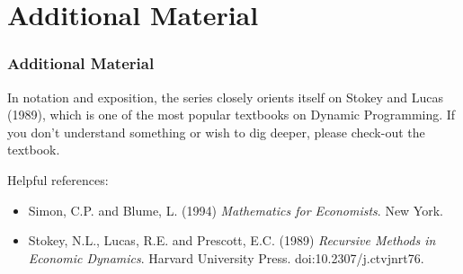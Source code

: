 \documentclass[aspectratio=169]{beamer}
\begin{document}
\section{Additional Material}

\begin{frame}
\frametitle{Additional Material}
In notation and exposition, the series closely orients itself on Stokey and Lucas (1989), which is one of the most popular textbooks on Dynamic Programming. If you don't understand something or wish to dig deeper, please check-out the textbook.
\medskip

Helpful references:
\begin{itemize}
\item Simon, C.P. and Blume, L. (1994) \textit{Mathematics for Economists}. New York.
\item Stokey, N.L., Lucas, R.E. and Prescott, E.C. (1989) \textit{Recursive Methods in Economic Dynamics}. Harvard University Press. doi:10.2307/j.ctvjnrt76.
\end{itemize}


\end{frame}
\end{document}
